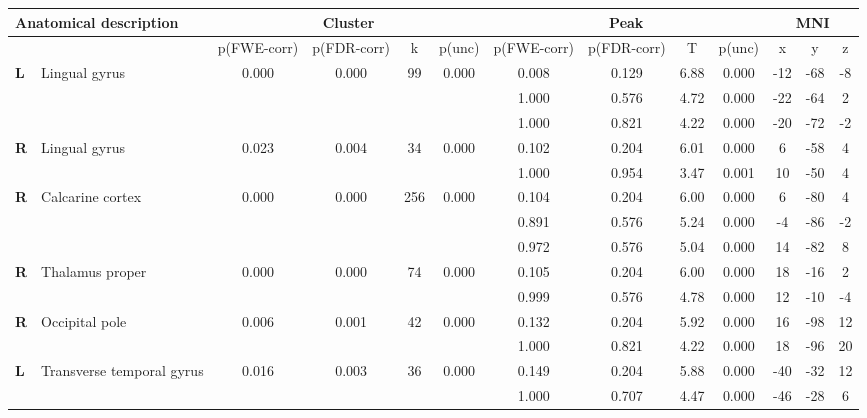 \begin{landscape}
\begin{fullwidth}
\begin{table}[!ht]
    \vspace*{-5cm}
    \raggedright
    \tiny %
     \begin{tabular}{ll|cccc|cccc|ccc} \\ \hline
        \multicolumn{2}{l}{\textbf{Anatomical description}} & \multicolumn{4}{c}{\textbf{Cluster}} & \multicolumn{4}{c}{\textbf{Peak}} &  \multicolumn{3}{c}{\textbf{MNI}} \\ \hline
        \multicolumn{2}{l}{\textbf{}} & \multicolumn{1}{l}{p(FWE-corr)} & p(FDR-corr) & k & \multicolumn{1}{l}{p(unc)} & p(FWE-corr) & p(FDR-corr) & T & \multicolumn{1}{l}{p(unc)} & x & y & z \\ \hline
        \textbf{L} & Lingual gyrus & 0.000 & 0.000 & 99 & 0.000 & 0.008 & 0.129 & 6.88 & 0.000 & -12 & -68 & -8 \\
        & & & & & & 1.000 & 0.576 & 4.72 & 0.000 & -22 & -64 & 2 \\
        & & & & & & 1.000 & 0.821 & 4.22 & 0.000 & -20 & -72 & -2 \\
        \textbf{R} & Lingual gyrus & 0.023 & 0.004 & 34 & 0.000 & 0.102 & 0.204 & 6.01 & 0.000 & 6 & -58 & 4 \\
        & & & & & & 1.000 & 0.954 & 3.47 & 0.001 & 10 & -50 & 4 \\
        \textbf{R} & Calcarine cortex & 0.000 & 0.000 & 256 & 0.000 & 0.104 & 0.204 & 6.00 & 0.000 & 6 & -80 & 4 \\
        & & & & & & 0.891 & 0.576 & 5.24 & 0.000 & -4 & -86 & -2 \\
        & & & & & & 0.972 & 0.576 & 5.04 & 0.000 & 14 & -82 & 8 \\
        \textbf{R} & Thalamus proper & 0.000 & 0.000 & 74 & 0.000 & 0.105 & 0.204 & 6.00 & 0.000 & 18 & -16 & 2 \\
        & & & & & & 0.999 & 0.576 & 4.78 & 0.000 & 12 & -10 & -4 \\
        \textbf{R} & Occipital pole & 0.006 & 0.001 & 42 & 0.000 & 0.132 & 0.204 & 5.92 & 0.000 & 16 & -98 & 12 \\
        & & & & & & 1.000 & 0.821 & 4.22 & 0.000 & 18 & -96 & 20 \\
        \textbf{L} & Transverse temporal gyrus & 0.016 & 0.003 & 36 & 0.000 & 0.149 & 0.204 & 5.88 & 0.000 & -40 & -32 & 12 \\
        & & & & & & 1.000 & 0.707 & 4.47 & 0.000 & -46 & -28 & 6 \\

\end{tabular}
\end{table}
\end{fullwidth}
\end{landscape}
